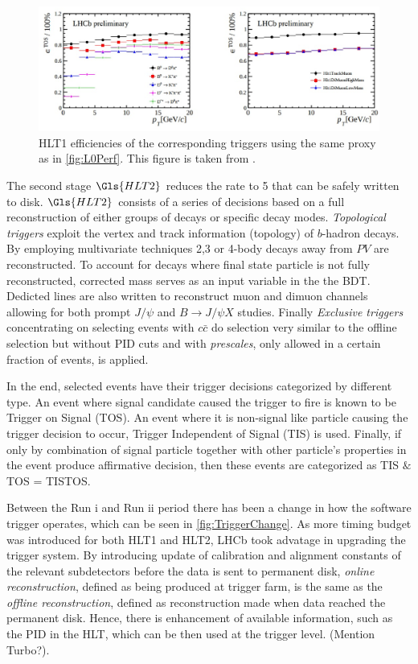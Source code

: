 \begin{figure}[!h]
	\centering
	\includegraphics[width = 1.0\textwidth]{figs/detector/HLT1performance.eps}%
	\caption{ \Gls{HLT1} efficiencies of the corresponding triggers using the same proxy as in \autoref{fig:L0Perf}.  This figure is taken from \cite{Albrecht:2013fba}. }  
	\label{fig:Hlt1Perf}
\end{figure}

The second stage $\Gls{HLT2}$ reduces the rate to 5 \khz that can be safely written to disk. $\Gls{HLT2}$ consists of a series of decisions based on a full reconstruction of either groups of decays or specific decay modes. \textit{Topological triggers} exploit the vertex and track information (topology) of $b$-hadron decays. By employing multivariate techniques 2,3 or 4-body decays away from $PV$ are reconstructed. To account for decays where final state particle is not fully reconstructed, corrected mass serves as an input variable in the the \Gls{BDT}. Dedicted lines are also written to reconstruct muon and dimuon channels allowing for both prompt $J/\psi$ and $B\rightarrow J/\psi X$ studies. Finally \textit{Exclusive triggers} concentrating on selecting events with $c\bar{c}$ do selection very similar to the offline selection but without \Gls{PID} cuts and with \textit{prescales}, only allowed in a certain fraction of events, is applied.


In the end, selected events have their trigger decisions categorized by different type.  An event where signal candidate caused the trigger to fire is known to be Trigger on Signal (\Gls{TOS}). An event where it is non-signal like particle causing the trigger decision to occur, Trigger Independent of Signal (\Gls{TIS}) is used. Finally, if only by combination of signal particle together with other particle's properties in the event produce affirmative decision, then these events are categorized as \Gls{TIS} $\&$ \Gls{TOS} = \Gls{TISTOS}.

Between the Run \Rn{1} and Run \Rn{2} period there has been a change in how the software trigger operates, which can be seen in \autoref{fig:TriggerChange}. As more timing budget was introduced for both \Gls{HLT1} and \Gls{HLT2}, \Gls{LHCb} took advatage in upgrading the trigger system. By introducing update of calibration and alignment constants of the relevant subdetectors before the data is sent to permanent disk, \textit{online reconstruction}, defined as being produced at trigger farm, is the same as the \textit{offline reconstruction}, defined as reconstruction made when data reached the permanent disk. Hence, there is enhancement of available information, such as the \Gls{PID} in the \Gls{HLT}, which can be then used at the trigger level. 
(Mention Turbo?).


